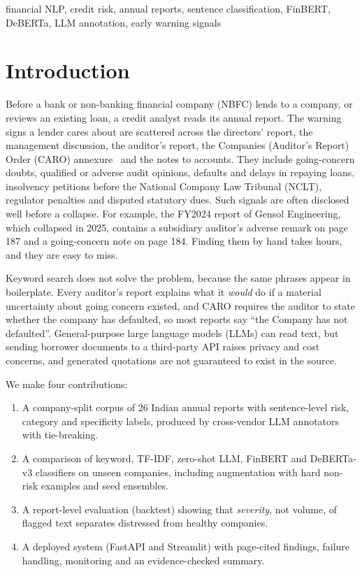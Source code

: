 \documentclass[conference]{IEEEtran}
\begin{document}
\begin{IEEEkeywords}
financial NLP, credit risk, annual reports, sentence classification, FinBERT, DeBERTa, LLM annotation, early warning signals
\end{IEEEkeywords}

\section{Introduction}
Before a bank or non-banking financial company (NBFC) lends to a company, or reviews an existing loan, a credit analyst reads its annual report. The warning signs a lender cares about are scattered across the directors' report, the management discussion, the auditor's report, the Companies (Auditor's Report) Order (CARO) annexure~\cite{caro2020} and the notes to accounts. They include going-concern doubts, qualified or adverse audit opinions, defaults and delays in repaying loans, insolvency petitions before the National Company Law Tribunal (NCLT), regulator penalties and disputed statutory dues. Such signals are often disclosed well before a collapse. For example, the FY2024 report of Gensol Engineering, which collapsed in 2025, contains a subsidiary auditor's adverse remark on page 187 and a going-concern note on page 184. Finding them by hand takes hours, and they are easy to miss.

Keyword search does not solve the problem, because the same phrases appear in boilerplate. Every auditor's report explains what it \emph{would} do if a material uncertainty about going concern existed, and CARO requires the auditor to state whether the company has defaulted, so most reports say ``the Company has not defaulted''. General-purpose large language models (LLMs) can read text, but sending borrower documents to a third-party API raises privacy and cost concerns, and generated quotations are not guaranteed to exist in the source.

We make four contributions:
\begin{enumerate}
\item A company-split corpus of 26 Indian annual reports with sentence-level risk, category and specificity labels, produced by cross-vendor LLM annotators with tie-breaking.
\item A comparison of keyword, TF-IDF, zero-shot LLM, FinBERT and DeBERTa-v3 classifiers on unseen companies, including augmentation with hard non-risk examples and seed ensembles.
\item A report-level evaluation (backtest) showing that \emph{severity}, not volume, of flagged text separates distressed from healthy companies.
\item A deployed system (FastAPI and Streamlit) with page-cited findings, failure handling, monitoring and an evidence-checked summary.
\end{enumerate}
\end{document}
